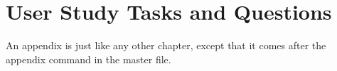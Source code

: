 \chapter{User Study Tasks and Questions}
\label{Study_questions}

An appendix is just like any other chapter, except that it comes after
the appendix command in the master file.

%
%
%
% 
%
%
% 
%
% 

